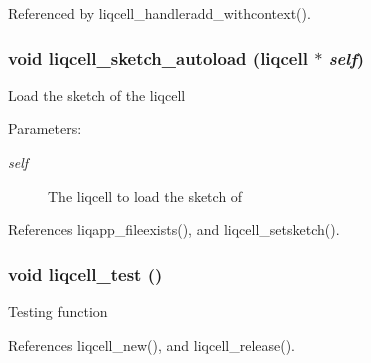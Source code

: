 Referenced by liqcell\_\-handleradd\_\-withcontext().
\subsubsection[{liqcell\_\-sketch\_\-autoload}]{\setlength{\rightskip}{0pt plus 5cm}void liqcell\_\-sketch\_\-autoload (liqcell $\ast$ {\em self})}\label{d5/da2/liqcell_8c_0cc39c8747c881d9bcb6513bd1f18fea}


Load the sketch of the liqcell \begin{Desc}
\item[Parameters:]
\begin{description}
\item[{\em self}]The liqcell to load the sketch of \end{description}
\end{Desc}


References liqapp\_\-fileexists(), and liqcell\_\-setsketch().
\subsubsection[{liqcell\_\-test}]{\setlength{\rightskip}{0pt plus 5cm}void liqcell\_\-test ()}\label{d5/da2/liqcell_8c_fbfdb285ecda8ef01ff24e5b3a1174f9}


Testing function 

References liqcell\_\-new(), and liqcell\_\-release().